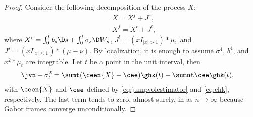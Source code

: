 \begin{proof}
  \begin{comment}  We wish to show that the random variable
  $\int_0^1 (\jvn - \sigma^2(t))^2\D t$ tends to zero in probability. The regularity conditions on $X$ and $\sigma^2$ imply that  $\sup_{t \in [0,1]} (\jvn - \sigma^2(t))^2$ is a random variable and that the previous claim would follow as soon as $\sup_{t \in [0,1]} (\jvn - \sigma^2(t))^2$ is shown  to converge to  zero in probability.\end{comment}
  Consider the following decomposition of the process $X$:
  \begin{align}
    &X = X^f + J^s\label{eq:xj},\\
    &X^f = X^c + J^l\label{eq:xjc},
  \end{align}
  where 
    $X^c = \int^t_0 b_s \D s + \int^t_0 \sigma_s \D W_s$, 
    $J^l = (xI_{\vert x \vert > 1}) \ast \mu,$
    and $J^s = (xI_{\vert x \vert \le  1} )\ast (\mu - \nu)$. By localization, it is enough to assume $\sigma^4$, $b^4$, and $x^2 \ast \mu_t$  are integrable. 
    Let $t$ be a point in the unit interval, then 
    \begin{align}
      \jvn -  \sigma^2_t &= \sumt (\ceen{X} - \cee) \ghk(t) - \sumnt \cee \ghk(t),
      \label{eq:open}
    \end{align}
    with $\ceen{X}$ and $\cee$ defined by \eqref{eq:jumpvolestimator} and \eqref{eq:chk}, respectively. The last term tends to zero, almost surely, in \Ltwo as $n \to \infty$ because Gabor frames converge unconditionally. 
    

\end{proof}

